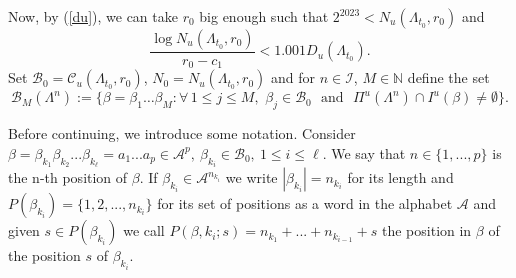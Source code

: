 \documentclass[12pt]{amsart}
\theoremstyle{plain} %
\theoremstyle{definition} %
\numberwithin{equation}{section}
\begin{document}
Now, by (\ref{du}), we can take $r_0$ big enough such that $2^{2023}<N_u(\Lambda_{t_0},r_0)$ and
\begin{equation}\label{estima3}
  \frac{\log N_u(\Lambda_{t_0},r_0)}{r_0-c_1}<1.001 D_u(\Lambda_{t_0}). 
\end{equation}
Set $\mathcal{B}_0=\mathcal{C}_u(\Lambda_{t_0},r_0)$, $N_0=N_u(\Lambda_{t_0},r_0)$ and for $n\in \mathcal{I}$, $M\in \mathbb{N}$ define the set
$$\mathcal{B}_M(\Lambda^n):=\{\beta=\beta_1\dots\beta_M :\forall \, 1\leq j\leq M, \,\, \beta_j\in\mathcal{B}_0 \,\,  \textrm{ and } \,\, \Pi^u(\Lambda^n)\cap I^u(\beta)\neq\emptyset\}.$$

Before continuing, we introduce some notation. Consider $\beta=\beta_{k_1}\beta_{k_2}...\beta_{k_ \ell}=a_1...a_p \in \mathcal{A}^{p}, \ \beta_{k_i}\in \mathcal{B}_0, \ 1\le i\le \ell$. We say that $n\in \{1,...,p\}$ is the n-th position of $\beta$. If $\beta_{k_i}\in \mathcal{A}^{n_{k_{i}}} $ we write $|\beta_{k_i}|=n_{k_i}$ for its length and $P(\beta_{k_i})=\{1,2,...,n_{k_i}\}$ for its set of positions as a word in the alphabet $\mathcal{A}$ and given $s \in P(\beta_{k_i})$ we call  $P(\beta,k_i;s)=n_{k_1}+...+n_{k_{i-1}}+s$ the position in $\beta$ of the position $s$ of $\beta_{k_i}$.	
\end{document}
